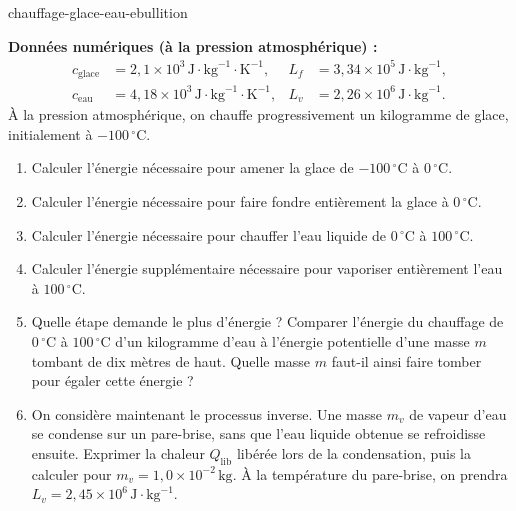 
\begin{exo}{chauffage-glace-eau-ebullition}

\textbf{Données numériques (à la pression atmosphérique) :}
\[
\begin{aligned}
c_{\text{glace}} &= 2{,}1\times10^3\,\text{J}\!\cdot\!\text{kg}^{-1}\!\cdot\!\text{K}^{-1},
& L_f &= 3{,}34\times10^5\,\text{J}\!\cdot\!\text{kg}^{-1},\\
c_{\text{eau}} &= 4{,}18\times10^3\,\text{J}\!\cdot\!\text{kg}^{-1}\!\cdot\!\text{K}^{-1},
& L_v &= 2{,}26\times10^6\,\text{J}\!\cdot\!\text{kg}^{-1}.
\end{aligned}
\]
À la pression atmosphérique, on chauffe progressivement un kilogramme de glace,
initialement à $-100\,{}^\circ\text{C}$.

\begin{enumerate}
  \item Calculer l'énergie nécessaire pour amener la glace de $-100\,{}^\circ\text{C}$ à $0\,{}^\circ\text{C}$.
  \item Calculer l'énergie nécessaire pour faire fondre entièrement la glace à $0\,{}^\circ\text{C}$.
  \item Calculer l'énergie nécessaire pour chauffer l'eau liquide de $0\,{}^\circ\text{C}$ à $100\,{}^\circ\text{C}$.
  \item Calculer l'énergie supplémentaire nécessaire pour vaporiser entièrement l'eau à $100\,{}^\circ\text{C}$.
  \item Quelle étape demande le plus d'énergie ? Comparer l'énergie du chauffage de $0\,{}^\circ\text{C}$ à $100\,{}^\circ\text{C}$ d'un kilogramme d'eau à l'énergie potentielle d'une masse $m$ tombant de dix mètres de haut. Quelle masse $m$ faut-il ainsi faire tomber pour égaler cette énergie ?
  \item On considère maintenant le processus inverse. Une masse $m_v$ de vapeur d'eau se condense sur un pare-brise, sans que l'eau liquide obtenue se refroidisse ensuite. Exprimer la chaleur $Q_{\text{lib}}$ libérée lors de la condensation, puis la calculer pour $m_v=1{,}0\times10^{-2}\,\text{kg}$. À la température du pare-brise, on prendra $L_v=2{,}45\times10^6\,\text{J}\!\cdot\!\text{kg}^{-1}$.
\end{enumerate}


\end{exo}
